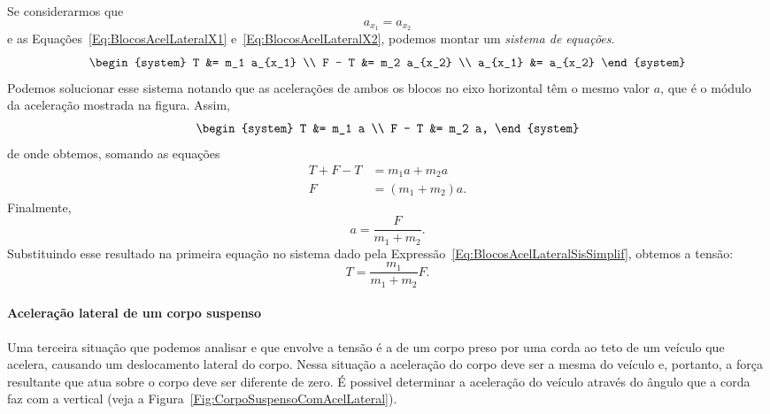 Se considerarmos que
\begin{equation}
    a_{x_1} = a_{x_2}
\end{equation}
%
e as Equações~\ref{Eq:BlocosAcelLateralX1} e~\ref{Eq:BlocosAcelLateralX2}, podemos montar um \emph{sistema de equações}.
\begin{equation}
\begin{system}
    T &= m_1 a_{x_1} \\
    F - T &= m_2 a_{x_2} \\
    a_{x_1} &= a_{x_2}
\end{system}
\end{equation}
%
Podemos solucionar esse sistema notando que as acelerações de ambos os blocos no eixo horizontal têm o mesmo valor $a$, que é o módulo da aceleração mostrada na figura. Assim,
\begin{equation}\label{Eq:BlocosAcelLateralSisSimplif}
\begin{system}
    T &= m_1 a \\
    F - T &= m_2 a,
\end{system}
\end{equation}
%
de onde obtemos, somando as equações
\begin{align}
    T + F - T &= m_1 a + m_2 a \\
    F &= (m_1 + m_2)a.
\end{align}
%
Finalmente,
\begin{equation}
    a = \frac{F}{m_1 + m_2}.
\end{equation}
%
Substituindo esse resultado na primeira equação no sistema dado pela Expressão~\eqref{Eq:BlocosAcelLateralSisSimplif}, obtemos a tensão:
\begin{equation}
    T = \frac{m_1}{m_1 + m_2} F.
\end{equation}

\paragraph{Aceleração lateral de um corpo suspenso}

Uma terceira situação que podemos analisar e que envolve a tensão é a de um corpo preso por uma corda ao teto de um veículo que acelera, causando um deslocamento lateral do corpo. Nessa situação a aceleração do corpo deve ser a mesma do veículo e, portanto, a força resultante que atua sobre o corpo deve ser diferente de zero. É possivel determinar a aceleração do veículo através do ângulo que a corda faz com a vertical (veja a Figura~\ref{Fig:CorpoSuspensoComAcelLateral}).

